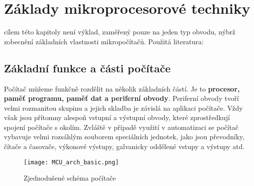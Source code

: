 \chapter{Základy mikroprocesorové techniky}
\minitoc
\newpage
  cílem této kapitoly není výklad, zaměřený pouze na jeden typ obvodu, nýbrž zobecnění základních vlastnosti 
  mikropočítačů. Použitá literatura: \cite{Pinker2004}
  
  \section{Základní funkce a části počítače}
    Počítač můžeme funkčně rozdělit na několik základních částí. Je to \textbf{procesor, paměť programu, 
    paměť dat a periferní obvody}. Periferní obvody tvoří velmi rozmanitou skupinu a jejich skladba je 
    závislá na aplikaci počítače. Vždy však jsou přítomny alespoň vstupní a výstupní obvody, které 
    zprostředkují spojení počítače s okolím. Zvláště v případě využití v automatizaci se počítač vybavuje 
    velmi rozsáhlým souborem speciálních jednotek, jako jsou převodníky, čítače a časovače, výkonové výstupy, 
    galvanicky oddělené vstupy a výstupy atd.
    
    \begin{figure}[ht!]   %
      \centering
      \texttt{[image: MCU\_arch\_basic.png]}
      \caption{Zjednodušené schéma počítače}
      \label{MIT:fig_pocitac01}
    \end{figure}

